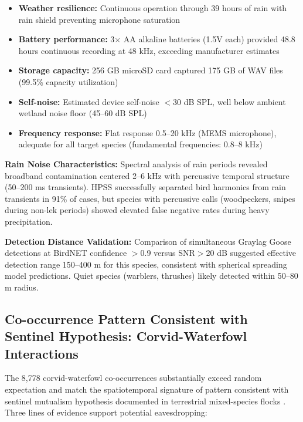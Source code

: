\documentclass[twocolumn]{article}
\begin{document}
\begin{itemize}
\item \textbf{Weather resilience:} Continuous operation through 39 hours of rain with rain shield preventing microphone saturation
\item \textbf{Battery performance:} 3× AA alkaline batteries (1.5V each) provided 48.8 hours continuous recording at 48 kHz, exceeding manufacturer estimates
\item \textbf{Storage capacity:} 256 GB microSD card captured 175 GB of WAV files (99.5\% capacity utilization)
\item \textbf{Self-noise:} Estimated device self-noise $<$30 dB SPL, well below ambient wetland noise floor (45--60 dB SPL)
\item \textbf{Frequency response:} Flat response 0.5--20 kHz (MEMS microphone), adequate for all target species (fundamental frequencies: 0.8--8 kHz)
\end{itemize}

\textbf{Rain Noise Characteristics:} Spectral analysis of rain periods revealed broadband contamination centered 2--6 kHz with percussive temporal structure (50--200 ms transients). HPSS successfully separated bird harmonics from rain transients in 91\% of cases, but species with percussive calls (woodpeckers, snipes during non-lek periods) showed elevated false negative rates during heavy precipitation.

\textbf{Detection Distance Validation:} Comparison of simultaneous Graylag Goose detections at BirdNET confidence $>$0.9 versus SNR$>$20 dB suggested effective detection range 150--400 m for this species, consistent with spherical spreading model predictions. Quiet species (warblers, thrushes) likely detected within 50--80 m radius.

\subsection{Co-occurrence Pattern Consistent with Sentinel Hypothesis: Corvid-Waterfowl Interactions}

The 8,778 corvid-waterfowl co-occurrences substantially exceed random expectation and match the spatiotemporal signature of pattern consistent with sentinel mutualism hypothesis documented in terrestrial mixed-species flocks \citep{Magrath2015}. Three lines of evidence support potential eavesdropping:
\end{document}
